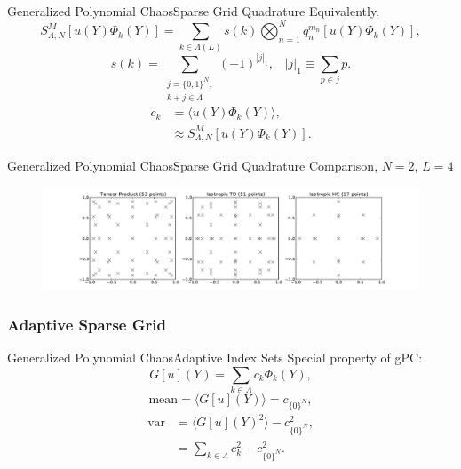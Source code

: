 \documentclass{beamer}
\begin{document}
\begin{frame}{Generalized Polynomial Chaos}{Sparse Grid Quadrature}%
  Equivalently,
\begin{equation*}
  S^{M}_{\Lambda,N}[u(Y)\Phi_k(Y)] = \sum_{k\in\Lambda(L)} s(k)\bigotimes_{n=1}^N
  q^{m_n}_n[u(Y)\Phi_k(Y)],
\end{equation*}
\begin{equation*}
  s(k) = \sum_{\substack{j=\{0,1\}^N,\\k+j\in\Lambda}} (-1)^{|j|_1},\hspace{10pt}|j|_1 \equiv \sum_{p\in j}p.
\end{equation*}
\begin{align*}
  c_k &= \langle u(Y)\Phi_k(Y) \rangle,\\
      &\approx S^{M}_{\Lambda,N}[u(Y)\Phi_k(Y)].
\end{align*}
\end{frame}

\begin{frame}{Generalized Polynomial Chaos}{Sparse Grid Quadrature}%
Comparison, $N=2$, $L=4$
    \begin{figure}[h!]
      \centering
       \hspace{-40pt}\includegraphics[width=1.15\textwidth]{../../graphics/sparse_plot}
    \end{figure}
\end{frame}

\subsubsection{Adaptive Sparse Grid}
\begin{frame}{Generalized Polynomial Chaos}{Adaptive Index Sets}%
  \pause
Special property of gPC:
\begin{equation*}
  G[u](Y) = \sum_{k\in\Lambda}c_k\Phi_k(Y),
\end{equation*}
\begin{equation*}
  \text{mean}=\langle G[u](Y)\rangle = c_{\{0\}^N},
\end{equation*}
\begin{align*}
  \text{var} &=\langle G[u](Y)^2\rangle - c_{\{0\}^N}^2,\\
      &= \sum_{k\in\Lambda}c_k^2 - c_{\{0\}^N}^2.
\end{align*}
\end{frame}
\end{document}
